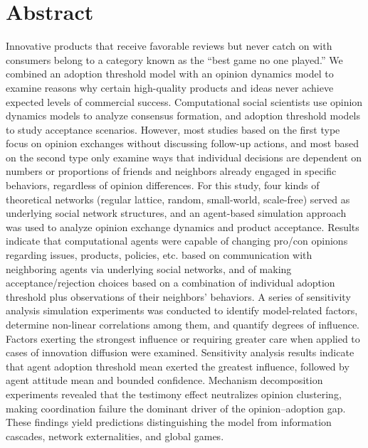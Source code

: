 \documentclass[10pt,letterpaper]{article}
\begin{document}
\section*{Abstract}
Innovative products that receive favorable reviews but never catch on with consumers belong to a category known as the ``best game no one played.'' We combined an adoption threshold model with an opinion dynamics model to examine reasons why certain high-quality products and ideas never achieve expected levels of commercial success. Computational social scientists use opinion dynamics models to analyze consensus formation, and adoption threshold models to study acceptance scenarios. However, most studies based on the first type focus on opinion exchanges without discussing follow-up actions, and most based on the second type only examine ways that individual decisions are dependent on numbers or proportions of friends and neighbors already engaged in specific behaviors, regardless of opinion differences. For this study, four kinds of theoretical networks (regular lattice, random, small-world, scale-free) served as underlying social network structures, and an agent-based simulation approach was used to analyze opinion exchange dynamics and product acceptance. Results indicate that computational agents were capable of changing pro/con opinions regarding issues, products, policies, etc. based on communication with neighboring agents via underlying social networks, and of making acceptance/rejection choices based on a combination of individual adoption threshold plus observations of their neighbors' behaviors. A series of sensitivity analysis simulation experiments was conducted to identify model-related factors, determine non-linear correlations among them, and quantify degrees of influence. Factors exerting the strongest influence or requiring greater care when applied to cases of innovation diffusion were examined. Sensitivity analysis results indicate that agent adoption threshold mean exerted the greatest influence, followed by agent attitude mean and bounded confidence. Mechanism decomposition experiments revealed that the testimony effect neutralizes opinion clustering, making coordination failure the dominant driver of the opinion--adoption gap. These findings yield predictions distinguishing the model from information cascades, network externalities, and global games.


\linenumbers
\end{document}
